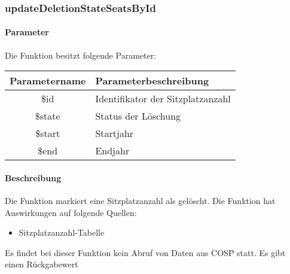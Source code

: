 \subsubsection{updateDeletionStateSeatsById}
\paragraph{Parameter} Die Funktion besitzt folgende Parameter:
\begin{table}[H]
	\begin{tabular}{|c|p{11cm}|}
		\hline
		\textbf{Parametername} & \textbf{Parameterbeschreibung} \\ \hline
		\$id        & Identifikator der Sitzplatzanzahl \\ \hline
		\$state & Status der Löschung \\ \hline
		\$start     & Startjahr \\ \hline
		\$end       & Endjahr \\ \hline
	\end{tabular}
\end{table}
\paragraph{Beschreibung} Die Funktion markiert eine Sitzplatzanzahl als gelöscht. Die Funktion hat Auswirkungen auf folgende Quellen:
\begin{itemize}
	\item Sitzplatzanzahl-Tabelle
\end{itemize}
Es findet bei dieser Funktion kein Abruf von Daten aus {\glqq COSP\grqq} statt. Es gibt einen Rückgabewert
